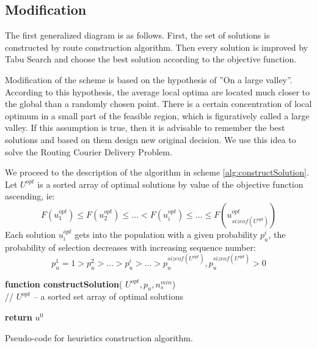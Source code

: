 \documentclass[]{TAACpaper}
\begin{document}
\subsection{Modification}

The first generalized diagram is as follows. First, the set of solutions is constructed by route construction algorithm. Then every solution is improved by Tabu Search and choose the best solution according to the objective function.

Modification of the scheme is based on the hypothesis of ''On a large valley''\cite{opt_Kochetov}. According to this hypothesis, the average local optima are located much closer to the global than a randomly chosen point. There is a certain concentration of local optimum in a small part of the feasible region, which is figuratively called a large valley. If this assumption is true, then it is advisable to remember the best solutions and based on them design new original decision. We use this idea to solve the  Routing Courier Delivery Problem.

We proceed to the description of the algorithm in scheme \ref{alg:constructSolution}. Let $U^{opt}$ is a sorted array of optimal solutions by value of the objective function ascending,  ie:
\begin{equation} \label{u_sorted}
F(u^{opt}_1) \leq F(u^{opt}_2) \leq \ldots < F(u^{opt}_i) \leq \ldots \leq F(u^{opt}_{sizeof(U^{opt})})
\end{equation}
Each solution $u^{opt}_i$ gets into the population with a given probability $p^i_u$, the probability of selection decreases with increasing sequence number:
\begin{equation} \label{p_sorted}
p^1_u = 1 > p^2_u > \ldots > p^i_u> \ldots   > p^{sizeof(U^{opt})}_u,  p^{sizeof(U^{opt})}_u > 0
\end{equation}

\begin{algorithm}[H]

	\textbf{function constructSolution}( $U^{opt}, p_u, n^{min}_s$) \\
	// $U^{opt}$ -- a sorted set array of optimal solutions \\
	
	
	
	
	
	\textbf{return} $u^0$
	
	\caption{Pseudo-code for heuristics construction algorithm.}
	\label{alg:constructSolution}
\end{algorithm}
\end{document}
